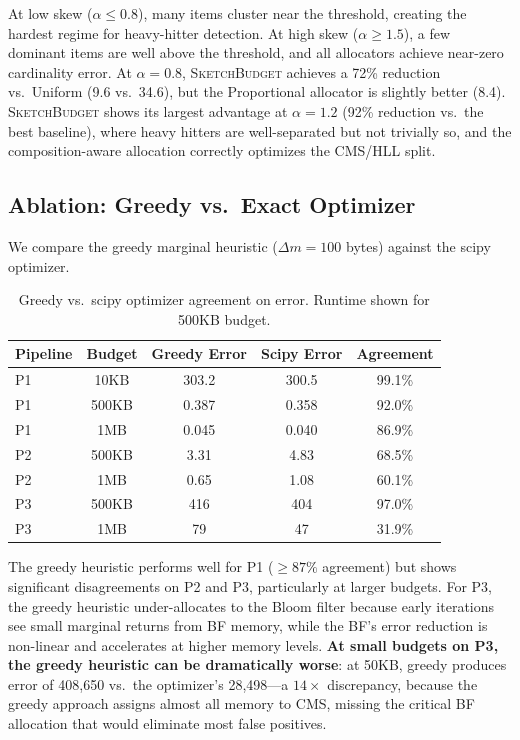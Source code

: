 \documentclass[preprint]{article}
\newcommand{\SketchBudget}{\textsc{SketchBudget}}
\begin{document}
At low skew ($\alpha \leq 0.8$), many items cluster near the threshold, creating the hardest regime for heavy-hitter detection. At high skew ($\alpha \geq 1.5$), a few dominant items are well above the threshold, and all allocators achieve near-zero cardinality error. At $\alpha=0.8$, \SketchBudget{} achieves a 72\% reduction vs.\ Uniform (9.6 vs.\ 34.6), but the Proportional allocator is slightly better (8.4). \SketchBudget{} shows its largest advantage at $\alpha=1.2$ (92\% reduction vs.\ the best baseline), where heavy hitters are well-separated but not trivially so, and the composition-aware allocation correctly optimizes the CMS/HLL split.

\subsection{Ablation: Greedy vs.\ Exact Optimizer}

We compare the greedy marginal heuristic ($\Delta m = 100$ bytes) against the scipy optimizer.

\begin{table}[t]
\centering
\caption{Greedy vs.\ scipy optimizer agreement on error. Runtime shown for 500KB budget.}
\label{tab:greedy}
\begin{tabular}{lcccc}
\toprule
Pipeline & Budget & Greedy Error & Scipy Error & Agreement \\
\midrule
P1 & 10KB  & 303.2 & 300.5 & 99.1\% \\
P1 & 500KB & 0.387 & 0.358 & 92.0\% \\
P1 & 1MB   & 0.045 & 0.040 & 86.9\% \\
\midrule
P2 & 500KB & 3.31  & 4.83  & 68.5\% \\
P2 & 1MB   & 0.65  & 1.08  & 60.1\% \\
\midrule
P3 & 500KB & 416   & 404   & 97.0\% \\
P3 & 1MB   & 79    & 47    & 31.9\% \\
\bottomrule
\end{tabular}
\end{table}

The greedy heuristic performs well for P1 ($\geq 87\%$ agreement) but shows significant disagreements on P2 and P3, particularly at larger budgets. For P3, the greedy heuristic under-allocates to the Bloom filter because early iterations see small marginal returns from BF memory, while the BF's error reduction is non-linear and accelerates at higher memory levels. \textbf{At small budgets on P3, the greedy heuristic can be dramatically worse}: at 50KB, greedy produces error of 408,650 vs.\ the optimizer's 28,498---a $14\times$ discrepancy, because the greedy approach assigns almost all memory to CMS, missing the critical BF allocation that would eliminate most false positives.
\end{document}
